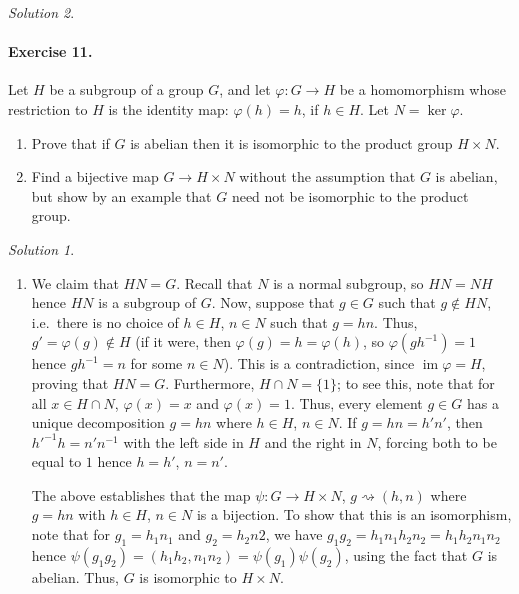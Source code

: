 \documentclass[11pt]{report}
\DeclareMathOperator\im{im}
\theoremstyle{remark}
\newtheorem*{solution}{Solution}
\begin{document}
\begin{solution}
    \paragraph{Exercise 11.} Let $H$ be a subgroup of a group $G$, and let
    $\varphi\colon G \to H$ be a homomorphism whose restriction to $H$ is the
    identity map: $\varphi(h) = h$, if $h \in H$. Let $N = \ker{\varphi}$.
    \begin{enumerate}
        \itemsep0em
        \item Prove that if $G$ is abelian then it is isomorphic to the product
        group $H \times N$.
        \item Find a bijective map $G \to H \times N$ without the assumption that
        $G$ is abelian, but show by an example that $G$ need not be isomorphic to
        the product group.
    \end{enumerate}
    \begin{solution} \mbox{}
    \begin{enumerate}
        \item We claim that $HN = G$. Recall that $N$ is a normal subgroup, so $HN =
        NH$ hence $HN$ is a subgroup of $G$. Now, suppose that $g \in G$ such that
        $g \notin HN$, i.e.\ there is no choice of $h \in H$, $n \in N$ such that $g
        = hn$. Thus, $g' = \varphi(g) \notin H$ (if it were, then $\varphi(g) = h =
        \varphi(h)$, so $\varphi(gh^{-1}) = 1$ hence $gh^{-1} = n$ for some $n \in
        N$). This is a contradiction, since $\im{\varphi} = H$, proving that $HN =
        G$. Furthermore, $H \cap N = \{1\}$; to see this, note that for all $x \in H
        \cap N$, $\varphi(x) = x$ and $\varphi(x) = 1$. Thus, every element $g \in
        G$ has a unique decomposition $g = hn$ where $h \in H$, $n \in N$. If $g =
        hn = h'n'$, then $h'^{-1}h = n'n^{-1}$ with the left side in $H$ and the
        right in $N$, forcing both to be equal to $1$ hence $h = h'$, $n = n'$.

        The above establishes that the map $\psi\colon G \to H\times N$, $g
        \rightsquigarrow (h, n)$ where $g = hn$ with $h \in H$, $n \in N$ is a
        bijection. To show that this is an isomorphism, note that for $g_1 = h_1n_1$
        and $g_2 = h_2n2$, we have $g_1g_2 = h_1n_1h_2n_2 = h_1h_2n_1n_2$ hence
        $\psi(g_1g_2) = (h_1h_2, n_1n_2) = \psi(g_1)\psi(g_2)$, using the fact that
        $G$ is abelian. Thus, $G$ is isomorphic to $H \times N$.


\end{enumerate}
\end{solution}
\end{solution}
\end{document}
